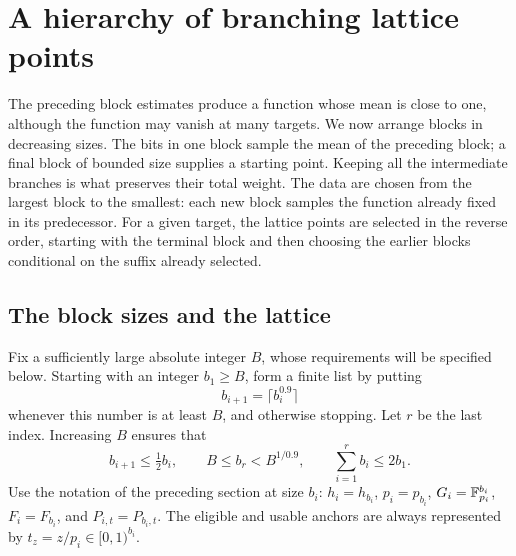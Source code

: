 \section{A hierarchy of branching lattice points}
\label{sec:hierarchy}

The preceding block estimates produce a function whose mean is close to one,
although the function may vanish at many targets.  We now arrange blocks in
decreasing sizes.  The bits in one block sample the mean of the preceding
block; a final block of bounded size supplies a starting point.  Keeping all
the intermediate branches is what preserves their total weight.
The data are chosen from the largest block to the smallest: each new
block samples the function already fixed in its predecessor. For a given
target, the lattice points are selected in the reverse order, starting
with the terminal block and then choosing the earlier blocks conditional
on the suffix already selected.

\subsection{The block sizes and the lattice}

Fix a sufficiently large absolute integer $B$, whose requirements will be
specified below.  Starting with an integer $b_1\ge B$, form a finite list by
putting
\[
 b_{i+1}=\lceil b_i^{0.9}\rceil
\]
whenever this number is at least $B$, and otherwise stopping.  Let $r$ be the
last index.  Increasing $B$ ensures that
\begin{equation}
 b_{i+1}\le \tfrac12 b_i,\qquad
 B\le b_r<B^{1/0.9},\qquad
 \sum_{i=1}^r b_i\le 2b_1.
 \label{eq:hierarchy-sizes}
\end{equation}
Use the notation of the preceding section at size $b_i$:
$h_i=h_{b_i}$, $p_i=p_{b_i}$, $G_i=\mathbb F_{p_i}^{b_i}$, $F_i=F_{b_i}$, and
$P_{i,t}=P_{b_i,t}$.  The eligible and usable anchors are always represented
by $t_z=z/p_i\in[0,1)^{b_i}$.

